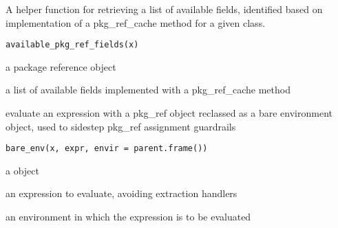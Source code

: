 \documentclass[a4paper]{book}
\begin{document}
%
\begin{Description}
A helper function for retrieving a list of available fields, identified based
on implementation of a pkg\_ref\_cache method for a given class.
\end{Description}
%
\begin{Usage}
\begin{verbatim}
available_pkg_ref_fields(x)
\end{verbatim}
\end{Usage}
%
\begin{Arguments}
\begin{ldescription}
\item[\code{x}] a package reference object
\end{ldescription}
\end{Arguments}
%
\begin{Value}
a list of available fields implemented with a pkg\_ref\_cache method
\end{Value}
%
\begin{Description}
evaluate an expression with a  pkg\_ref object reclassed as a bare environment
object, used to sidestep pkg\_ref assignment guardrails
\end{Description}
%
\begin{Usage}
\begin{verbatim}
bare_env(x, expr, envir = parent.frame())
\end{verbatim}
\end{Usage}
%
\begin{Arguments}
\begin{ldescription}
\item[\code{x}] a  object

\item[\code{expr}] an expression to evaluate, avoiding  extraction
handlers

\item[\code{envir}] an environment in which the expression is to be evaluated
\end{ldescription}
\end{Arguments}
\end{document}
